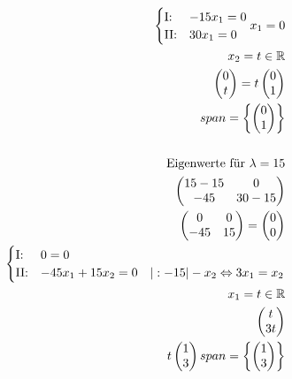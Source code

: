 \begin{align*}
\begin{cases}
        \text{I:\@} & -15x_1 = 0 \\
        \text{II:\@} & 30x_1 = 0 
    \end{cases}
    x_1 = 0 \\
    x_2 = t \in \mathbb{R}\\
    \begin{pmatrix}
        0 \\ t
    \end{pmatrix} = t \begin{pmatrix}
        0 \\ 1
    \end{pmatrix} \\
    span = \left\{\begin{pmatrix}
        0 \\ 1
    \end{pmatrix}\right\}\\\\
    \text{Eigenwerte für } \lambda = 15 \\
    \begin{pmatrix}
        15 - 15 & 0 \\
        -45 & 30 - 15
    \end{pmatrix} \\
    \begin{pmatrix}
        0 & 0 \\
        -45 & 15
    \end{pmatrix} = \begin{pmatrix}
        0 \\ 0
    \end{pmatrix} \\
    \begin{cases}
        \text{I:\@} & 0 = 0 \\
        \text{II:\@} & -45x_1 + 15x_2 = 0 \quad | :-15 | -x_2 \Leftrightarrow 3x_1 = x_2
    \end{cases} \\
    x_1 = t \in \mathbb{R} \\
    \begin{pmatrix}
        t \\
        3t
    \end{pmatrix} \\
    t \begin{pmatrix}
        1 \\ 3
    \end{pmatrix}
    span = \left\{\begin{pmatrix}
        1 \\ 3
    \end{pmatrix}\right\}
\end{align*}

